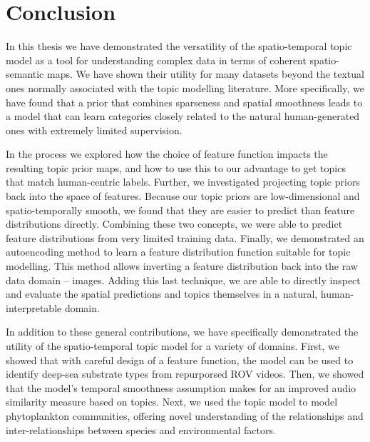 
\chapter{Conclusion}

In this thesis we have demonstrated the versatility of the spatio-temporal topic model as a tool for understanding complex data in terms of coherent spatio-semantic maps. We have shown their utility for many datasets beyond the textual ones normally associated with the topic modelling literature. More specifically, we have found that a prior that combines sparseness and spatial smoothness leads to a model that can learn categories closely related to the natural human-generated ones with extremely limited supervision.

In the process we explored how the choice of feature function impacts the resulting topic prior maps, and how to use this to our advantage to get topics that match human-centric labels. Further, we investigated projecting topic priors back into the space of features. Because our topic priors are low-dimensional and spatio-temporally smooth, we found that they are easier to predict than feature distributions directly. Combining these two concepts, we were able to predict feature distributions from very limited training data. Finally, we demonstrated an autoencoding method to learn a feature distribution function suitable for topic modelling. This method allows inverting a feature distribution back into the raw data domain -- images. Adding this last technique, we are able to directly inspect and evaluate the spatial predictions and topics themselves in a natural, human-interpretable domain.

In addition to these general contributions, we have specifically demonstrated the utility of the spatio-temporal topic model for a variety of domains. First, we showed that with careful design of a feature function, the model can be used to identify deep-sea substrate types from repurporsed ROV videos. Then, we showed that the model's temporal smoothness assumption makes for an improved audio similarity measure based on topics. Next, we used the topic model to model phytoplankton communities, offering novel understanding of the relationships and inter-relationships between species and environmental factors.

